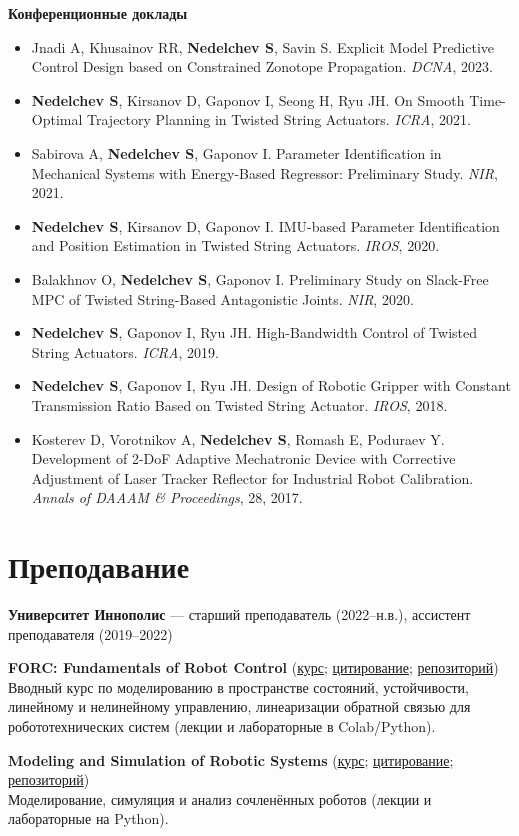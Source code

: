 \documentclass[11pt,a4paper]{article}
\newcommand{\cvitem}[2]{\item #1 #2}
\begin{document}
\textbf{Конференционные доклады}
\begin{itemize}[leftmargin=*, nosep, topsep=0.25em]
  \cvitem{}{Jnadi A, Khusainov RR, \textbf{Nedelchev S}, Savin S. Explicit Model Predictive Control Design based on Constrained Zonotope Propagation. \emph{DCNA}, 2023.}
  \cvitem{}{\textbf{Nedelchev S}, Kirsanov D, Gaponov I, Seong H, Ryu JH. On Smooth Time-Optimal Trajectory Planning in Twisted String Actuators. \emph{ICRA}, 2021.}
  \cvitem{}{Sabirova A, \textbf{Nedelchev S}, Gaponov I. Parameter Identification in Mechanical Systems with Energy-Based Regressor: Preliminary Study. \emph{NIR}, 2021.}
  \cvitem{}{\textbf{Nedelchev S}, Kirsanov D, Gaponov I. IMU-based Parameter Identification and Position Estimation in Twisted String Actuators. \emph{IROS}, 2020.}
  \cvitem{}{Balakhnov O, \textbf{Nedelchev S}, Gaponov I. Preliminary Study on Slack-Free MPC of Twisted String-Based Antagonistic Joints. \emph{NIR}, 2020.}
  \cvitem{}{\textbf{Nedelchev S}, Gaponov I, Ryu JH. High-Bandwidth Control of Twisted String Actuators. \emph{ICRA}, 2019.}
  \cvitem{}{\textbf{Nedelchev S}, Gaponov I, Ryu JH. Design of Robotic Gripper with Constant Transmission Ratio Based on Twisted String Actuator. \emph{IROS}, 2018.}
  \cvitem{}{Kosterev D, Vorotnikov A, \textbf{Nedelchev S}, Romash E, Poduraev Y. Development of 2-DoF Adaptive Mechatronic Device with Corrective Adjustment of Laser Tracker Reflector for Industrial Robot Calibration. \emph{Annals of DAAAM \& Proceedings}, 28, 2017.}
\end{itemize}

\section{Преподавание}

\textbf{Университет Иннополис} — старший преподаватель (2022--н.в.), ассистент преподавателя (2019--2022)

\textbf{FORC: Fundamentals of Robot Control} (\href{https://simeon-ned.github.io/forc/}{курс}; \href{https://simeon-ned.github.io/forc/cite/}{цитирование}; \href{https://github.com/simeon-ned/forc}{репозиторий})\\
Вводный курс по моделированию в пространстве состояний, устойчивости, линейному и нелинейному управлению, линеаризации обратной связью для робототехнических систем (лекции и лабораторные в Colab/Python).

\textbf{Modeling and Simulation of Robotic Systems} (\href{https://simeon-ned.github.io/robotic_systems/}{курс}; \href{https://simeon-ned.github.io/robotic_systems/cite/}{цитирование}; \href{https://github.com/simeon-ned/robotic_systems}{репозиторий})\\
Моделирование, симуляция и анализ сочленённых роботов (лекции и лабораторные на Python).
\end{document}
